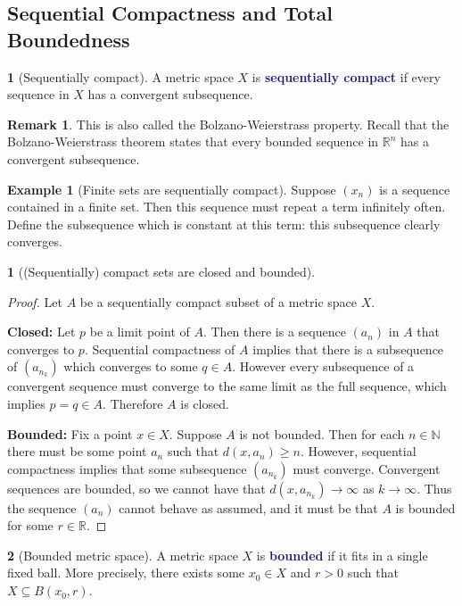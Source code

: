 \documentclass[12pt]{article}
\numberwithin{equation}{section}
\newcommand{\navy}[1]{\textcolor{MidnightBlue}{\bf #1}}
\theoremstyle{plain}
\newtheorem{theorem}{\color{ForestGreen}{\textbf{Theorem}}}[section]
\theoremstyle{definition}
\newtheorem{definition}{\color{MidnightBlue}{\textbf{Definition}}}[section]
\newtheorem{example}{\color{WildStrawberry}Example}[section]
\newtheorem*{remark}{Remark}
\newcommand{\1}{\mathbbm 1}
\newcommand{\RR}{\mathbb R}
\newcommand{\NN}{\mathbb N}
\begin{document}
\subsection{Sequential Compactness and Total Boundedness}

\begin{definition}[Sequentially compact]
	A metric space $X$ is \navy{sequentially compact} if every sequence in $X$ has a convergent subsequence. 
	\begin{remark}
	This is also called the Bolzano-Weierstrass property. Recall that the Bolzano-Weierstrass theorem states that every bounded sequence in $\RR^n$ has a convergent subsequence. 
	\end{remark}	
\end{definition}

\begin{example}[Finite sets are sequentially compact]
	Suppose $(x_n)$ is a sequence contained in a finite set. Then this sequence must repeat a term infinitely often. Define the subsequence which is constant at this term: this subsequence clearly converges. 
\end{example}

\begin{theorem}[(Sequentially) compact sets are closed and bounded]
\end{theorem}
\begin{proof}
	Let $A$ be a sequentially compact subset of a metric space $X$.

	\textbf{Closed:} Let $p$ be a limit point of $A$. Then there is a sequence $(a_n)$ in $A$ that converges to $p$. Sequential compactness of $A$ implies that there is a subsequence of $(a_{n_k})$ which converges to some $q \in A$. However every subsequence of a convergent sequence must converge to the same limit as the full sequence, which implies $p=q \in A$. Therefore $A$ is closed. 

	\textbf{Bounded:} Fix a point $x \in X$. Suppose $A$ is not bounded. Then for each $n \in \NN$ there must be some point $a_n$ such that $d(x,a_n) \geq n$. However, sequential compactness implies that some subsequence $(a_{n_k})$ must converge. Convergent sequences are bounded, so we cannot have that $d(x,a_{n_k}) \to \infty$ as $k \to \infty$. Thus the sequence $(a_n)$ cannot behave as assumed, and it must be that $A$ is bounded for some $r \in \RR$. 

\end{proof}


\begin{definition}[Bounded metric space]
	A metric space $X$ is \navy{bounded} if it fits in a single fixed ball. More precisely, there exists some $x_0 \in X$ and $r > 0$ such that $X \subseteq B(x_0,r)$. 
\end{definition}
\end{document}
